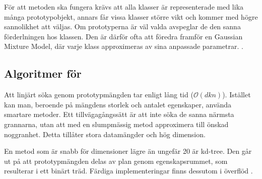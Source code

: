 \documentclass[../rapport_MVEX01-11-05]{subfiles}
\begin{document}
För att metoden ska fungera krävs att alla klasser är representerade med lika
många prototypobjekt, annars får vissa klasser större vikt och kommer med högre
sannolikhet att väljas. Om prototyperna är väl valda avspeglar de den sanna
förderlningen hos klassen.
Den är därför ofta att föredra framför en Gaussian Mixture Model, där
varje klass approximeras av sina anpassade parametrar.
\cite{Hastie09}.

\subsection{Algoritmer för \knn}
Att linjärt söka genom prototypmängden tar enligt
 lång tid ($\mathcal{O}(d k n)$).
Istället kan man, beroende på mängdens storlek och antalet egenskaper,
använda smartare metoder.
Ett tillvägagångssätt är att inte söka de sanna närmsta grannarna,
utan att med en slumpmässig metod approximera till önskad noggranhet.
Detta tillåter stora datamängder och hög dimension.

En metod som är snabb för dimensioner lägre än ungefär 20 är kd-tree.
Den går ut på att prototypmängden delas av plan genom egenskapsrummet,
som resulterar i ett binärt träd. Färdiga implementeringar finns dessutom
i överflöd \cite{Skiena08}.

%

\end{document}

